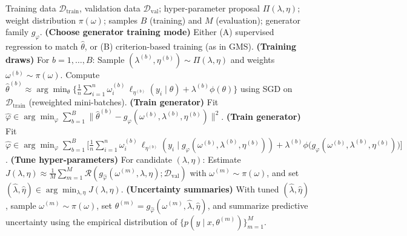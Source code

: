 \documentclass[12pt]{article}
\begin{document}
\begin{algorithm}[H]
\caption{Generative WBB for hyper-parameter tuning and uncertainty summaries}
\label{alg:gwbb}
\begin{algorithmic}[1]
\Require Training data $\mathcal{D}_{\mathrm{train}}$, validation data $\mathcal{D}_{\mathrm{val}}$; hyper-parameter proposal $\Pi(\lambda,\eta)$; weight distribution $\pi(\omega)$; samples $B$ (training) and $M$ (evaluation); generator family $g_{\varphi}$.
\State \textbf{(Choose generator training mode)} Either (A) supervised regression to match $\hat{\theta}$, or (B) criterion-based training (as in GMS).
\State \textbf{(Training draws)} For $b=1,\ldots,B$:
\State \hspace{1em}Sample $(\lambda^{(b)},\eta^{(b)})\sim \Pi(\lambda,\eta)$ and weights $\omega^{(b)}\sim \pi(\omega)$.
\State \hspace{1em}Compute $\hat{\theta}^{(b)} \approx \arg\min_{\theta}\Big\{\frac{1}{n}\sum_{i=1}^n \omega_i^{(b)}\,\ell_{\eta^{(b)}}(y_i\mid \theta) + \lambda^{(b)}\phi(\theta)\Big\}$ using SGD on $\mathcal{D}_{\mathrm{train}}$ (reweighted mini-batches).
\State \textbf{(Train generator)} Fit $\hat{\varphi}\in\arg\min_{\varphi}\sum_{b=1}^B \big\|\hat{\theta}^{(b)} - g_{\varphi}(\omega^{(b)},\lambda^{(b)},\eta^{(b)})\big\|^2$.
\Else
\State \textbf{(Train generator)} Fit $\hat{\varphi}\in\arg\min_{\varphi}\sum_{b=1}^B \Big[\frac{1}{n}\sum_{i=1}^n \omega_i^{(b)}\,\ell_{\eta^{(b)}}(y_i\mid g_{\varphi}(\omega^{(b)},\lambda^{(b)},\eta^{(b)})) + \lambda^{(b)}\phi\big(g_{\varphi}(\omega^{(b)},\lambda^{(b)},\eta^{(b)})\big)\Big]$.
\EndIf
\State \textbf{(Tune hyper-parameters)} For candidate $(\lambda,\eta)$:
\State \hspace{1em}Estimate $J(\lambda,\eta)\approx \frac{1}{M}\sum_{m=1}^M \mathcal{R}(g_{\hat{\varphi}}(\omega^{(m)},\lambda,\eta);\mathcal{D}_{\mathrm{val}})$ with $\omega^{(m)}\sim\pi(\omega)$, and set $(\hat{\lambda},\hat{\eta})\in\arg\min_{\lambda,\eta} J(\lambda,\eta)$.
\State \textbf{(Uncertainty summaries)} With tuned $(\hat{\lambda},\hat{\eta})$, sample $\omega^{(m)}\sim\pi(\omega)$, set $\theta^{(m)}=g_{\hat{\varphi}}(\omega^{(m)},\hat{\lambda},\hat{\eta})$, and summarize predictive uncertainty using the empirical distribution of $\{p(y\mid x,\theta^{(m)})\}_{m=1}^M$.
\end{algorithmic}
\end{algorithm}
\end{document}

